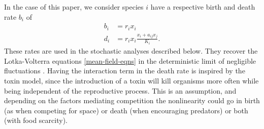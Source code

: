\documentclass[a4paper,10pt]{article}
\numberwithin{equation}{section} %
\begin{document}
In the case of this paper, we consider species $i$ have a respective birth and death rate $b_i$ of%
\begin{equation}
 \begin{aligned}
 b_i &= r_i x_i \\
 d_i &= r_i x_i\frac{x_i+a_{ij}x_j}{K_i}.
 \end{aligned}
\end{equation} \label{deathrate}
These rates are used in the stochastic analyses described below. 
They recover the Lotka-Volterra equations \ref{mean-field-eqns} in the deterministic limit of negligible fluctuations \cite{Nisbet1982}. %
Having the interaction term in the death rate is inspired by the toxin model, since the introduction of a toxin will kill organisms more often while being independent of the reproductive process. 
This is an assumption, and depending on the factors mediating competition the nonlinearity could go in birth (as when competing for space) or death (when encouraging predators) or both (with food scarcity). 
\end{document}
